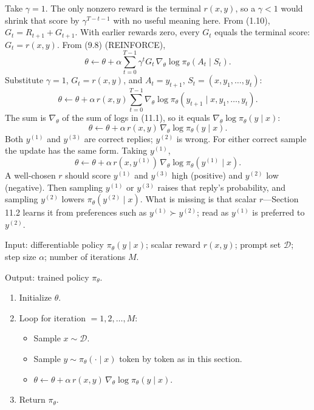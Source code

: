 Take $\gamma=1$. The only nonzero reward is the terminal $r(x,y)$, so a $\gamma<1$ would shrink that score by $\gamma^{T-t-1}$ with no useful meaning here. From (1.10), $G_t=R_{t+1}+G_{t+1}$. With earlier rewards zero, every $G_t$ equals the terminal score: $G_t=r(x,y)$. From (9.8) (REINFORCE), \[
\theta
\leftarrow
\theta+\alpha\sum_{t=0}^{T-1}\gamma^{t}G_t\,\nabla_\theta\log\pi_\theta(A_t\mid S_t).
\] Substitute $\gamma=1$, $G_t=r(x,y)$, and $A_t=y_{t+1}$, $S_t=(x,y_1,\ldots,y_t)$: \[
\theta
\leftarrow
\theta+\alpha\,r(x,y)\sum_{t=0}^{T-1}\nabla_\theta\log\pi_\theta(y_{t+1}\mid x,y_1,\ldots,y_t).
\] The sum is $\nabla_\theta$ of the sum of logs in (11.1), so it equals $\nabla_\theta\log\pi_\theta(y\mid x)$: \[
\theta
\leftarrow
\theta+\alpha\,r(x,y)\,\nabla_\theta\log\pi_\theta(y\mid x).
\] Both $y^{(1)}$ and $y^{(3)}$ are correct replies; $y^{(2)}$ is wrong. For either correct sample the update has the same form. Taking $y^{(1)}$, \[
\theta
\leftarrow
\theta+\alpha\,r(x,y^{(1)})\,\nabla_\theta\log\pi_\theta(y^{(1)}\mid x).
\] A well-chosen $r$ should score $y^{(1)}$ and $y^{(3)}$ high (positive) and $y^{(2)}$ low (negative). Then sampling $y^{(1)}$ or $y^{(3)}$ raises that reply's probability, and sampling $y^{(2)}$ lowers $\pi_\theta(y^{(2)}\mid x)$. What is missing is that scalar $r$---Section 11.2 learns it from preferences such as $y^{(1)}\succ y^{(2)}$; read as $y^{(1)}$ is preferred to $y^{(2)}$.

\begin{implnote}
Input: differentiable policy $\pi_\theta(y\mid x)$; scalar reward $r(x,y)$; prompt set $\mathcal{D}$; step size $\alpha$; number of iterations $M$.

Output: trained policy $\pi_\theta$.

\begin{enumerate}
\item Initialize $\theta$.
\item Loop for iteration $=1,2,\ldots,M$:
\begin{itemize}
\item Sample $x\sim\mathcal{D}$.
\item Sample $y\sim\pi_\theta(\cdot\mid x)$ token by token as in this section.
\item $\theta\leftarrow\theta+\alpha\,r(x,y)\,\nabla_\theta\log\pi_\theta(y\mid x)$.
\end{itemize}
\item Return $\pi_\theta$.
\end{enumerate}

\end{implnote}

